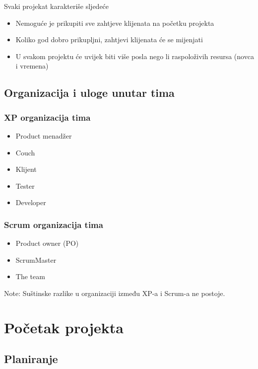 \documentclass[lmodern, utf8, zavrsni]{fit}
\begin{document}
Svaki projekat karakteriše sljedeće\citep{agilesamurai}
\begin{itemize}
  \item{Nemoguće je prikupiti sve zahtjeve klijenata na početku projekta}
  \item{Koliko god dobro prikupljni, zahtjevi klijenata će se mijenjati}
  \item{U svakom projektu će uvijek biti više posla nego li raspoloživih resursa (novca i vremena)}
\end{itemize}


\section{Organizacija i uloge unutar tima}

\subsection{XP organizacija tima}

\begin{itemize}
  \item{Product menadžer}
  \item{Couch}
  \item{Klijent}
  \item{Tester}
  \item{Developer}
\end{itemize}

\subsection{Scrum organizacija tima}

\begin{itemize}
    \item Product owner (PO)
    \item ScrumMaster
    \item The team
\end{itemize}

Note: Suštinske razlike u organizaciji između XP-a i Scrum-a ne postoje. 

\chapter{Početak projekta}

\section{Planiranje}
\end{document}
